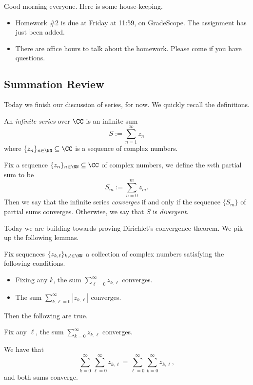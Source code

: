 
Good morning everyone. Here is some house-keeping.
\begin{itemize}
	\item Homework \#2 is due at Friday at 11:59, on GradeScope. The assignment has just been added.
	\item There are office hours to talk about the homework. Please come if you have questions.
\end{itemize}

\subsection{Summation Review}
Today we finish our discussion of series, for now. We quickly recall the definitions.
\begin{definition}[Series]
	An \textit{infinite series} over $\CC$ is an infinite sum
	\[S:=\sum_{n=1}^\infty z_n\]
	where $\{z_n\}_{n\in\NN}\subseteq\CC$ is a sequence of complex numbers.
\end{definition}
\begin{definition}
	Fix a sequence $\{z_n\}_{n\in\NN}\subseteq\CC$ of complex numbers, we define the $m$th partial sum to be
	\[S_m:=\sum_{n=0}^mz_m.\]
	Then we say that the infinite series \textit{converges} if and only if the sequence $\{S_m\}$ of partial sums converges. Otherwise, we say that $S$ is \textit{divergent}.
\end{definition}
Today we are building towards proving Dirichlet's convergence theorem. We pik up the following lemmas.
\begin{lemma}
	Fix sequences $\{z_{k,\ell}\}_{k,\ell\in\NN}$ a collection of complex numbers satisfying the following conditions.
	\begin{itemize}
		\item Fixing any $k$, the sum $\sum_{\ell=0}^\infty z_{k,\ell}$ converges.
		\item The sum $\sum_{k,\ell=0}^\infty|z_{k,\ell}|$ converges.
	\end{itemize}
	Then the following are true.
	\begin{listalph}
		\item Fix any $\ell$, the sum $\sum_{k=0}^\infty z_{k,\ell}$ converges.
		\item We have that
		\[\sum_{k=0}^\infty\sum_{\ell=0}^\infty z_{k,\ell}=\sum_{\ell=0}^\infty\sum_{k=0}^\infty z_{k,\ell},\]
		and both sums converge.
	\end{listalph}
\end{lemma}
